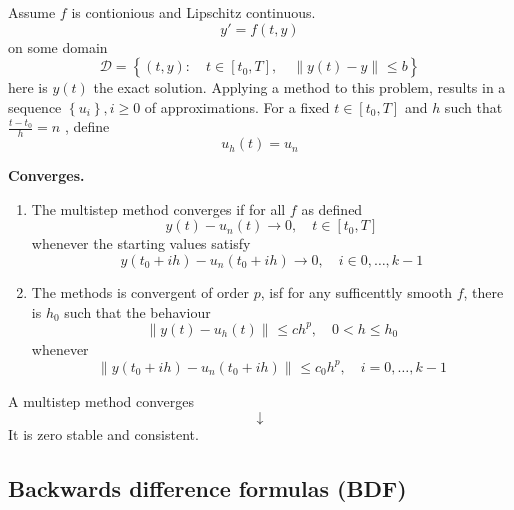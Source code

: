 \documentclass{article}
\theoremstyle{remark}
\begin{document}
Assume $f$ is contionious and Lipschitz continuous. 
\[
y'  = f\left( t,y \right)
\] 
on some domain \[
\mathcal{D}  = \left\{ \left( t,y \right): \quad  t \in  \left[ t_{0}, T \right], \quad  \|y\left( t \right) - y\|_{}^{} \le b   \right\}
\] 
here is $y\left( t \right)$ the exact solution. Applying a method to this problem, results in a sequence $\left\{u_{i}  \right\}, i \ge 0 $ of approximations. For a fixed $t \in  \left[ t_{0}, T \right]$ and $h$ such that $\frac{t - t_{0}}{ h}  = n$ , define \[
u_{h} \left( t \right) = u_{n}
\] 
\begin{definition}
  \textbf{Converges.}  
  \begin{enumerate}[label=(\roman*)]
    \item The multistep method converges if for all $f$ as defined \[
    y\left( t \right) - u_{n} \left( t \right) \to  0, \quad  t \in  \left[ t_{0}, T \right] 
    \] 
   whenever the starting values satisfy \[
   y\left( t_{0} + ih \right)  - u_{n} \left( t_{0} + ih \right) \to  0, \quad  i \in 0,\ldots, k-1 
   \]  
 \item The methods is convergent of order $p $, isf for any sufficenttly smooth $ f$, there is $h_{0}$ such that the behaviour \[
     \|y\left( t \right) - u_{h}\left( t \right)\|_{}^{} \le ch^{p} , \quad  0< h \le h_{0} 
 \] 
 whenever \[
 \|y\left( t_{0} + ih \right) - u_{n}\left( t_{0} + ih \right)\|_{}^{} \le c_{0} h^{p}, \quad i = 0, \ldots, k-1 
 \] 
  \end{enumerate}
\end{definition}

\begin{theorem}
  A multistep method converges \[
  \downarrow
  \] 
  \quad\quad\quad\quad\quad\quad      \quad It is zero stable and consistent.
\end{theorem}


\subsection{Backwards difference formulas (BDF)}%
\label{sub:backwards_difference_formulas_bdf_}
\end{document}
